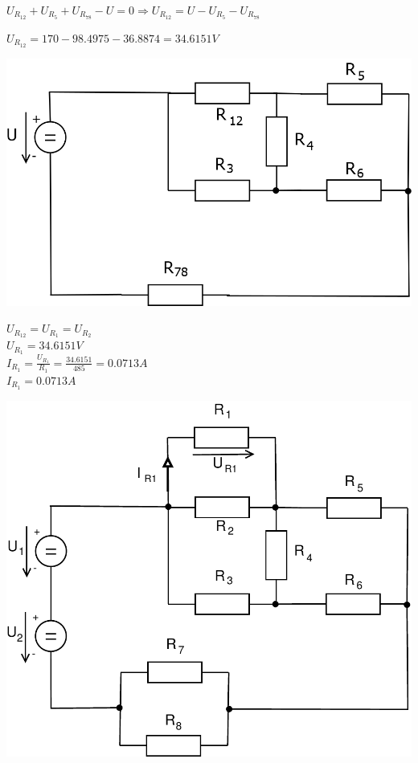\documentclass{article}
\begin{document}
\begin{large}
    $U_{R_{12}}+U_{R_5}+U_{R_{78}}-U=0\Rightarrow U_{R_{12}}=U-U_{R_5}-U_{R_{78}}$
    
    $U_{R_{12}}=170-98.4975-36.8874=34.6151V$\\
    
    
    


\begin{center}
    \includegraphics[scale=0.3]{Pr1/Pr1_2.png}
\end{center}

\newpage


    $U_{R_{12}}=U_{R_1}=U_{R_{2}}$\\
    
    \underline{$U_{R_1}=34.6151V$}\\
    
    $I_{R_1}=\frac{U_{R_1}}{R_1}=\frac{34.6151}{485}=0.0713A$\\
    
    \underline{$I_{R_1}=0.0713A$}
    


\begin{center}
    \includegraphics[scale=0.6]{Pr1/Pr1_2017.pdf}
\end{center}


\end{large}
\end{document}
